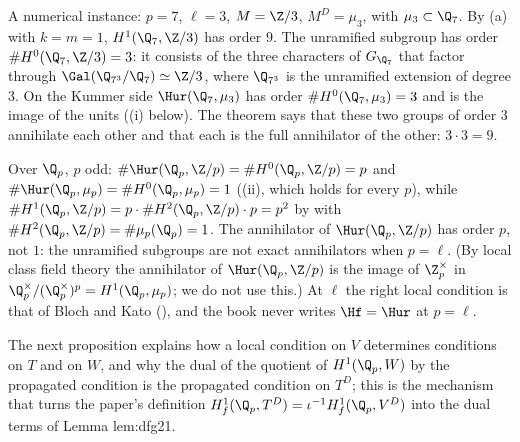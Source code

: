 \noindent A numerical instance: $p=7$, $\ell=3$, $M=\Z/3$, $M^D=\mu_3$, with $\mu_3\subset\Q_7$. By (a) with $k=m=1$, $H^1(\Q_7,\Z/3)$ has order $9$.
The unramified subgroup has order $\#H^0(\Q_7,\Z/3)=3$: it consists of the three characters of $G_{\Q_7}$ that factor through $\Gal(\Q_{7^3}/\Q_7)\simeq\Z/3$, where $\Q_{7^3}$ is
the unramified extension of degree $3$. On the Kummer side $\Hur(\Q_7,\mu_3)$ has order $\#H^0(\Q_7,\mu_3)=3$ and is the image of the units ((i)
below). The theorem says that these two groups of order $3$ annihilate each other and that each is the full annihilator of the other: $3\cdot3=9$.

\begin{warning}[the case $p=\ell$]\label{warn:galcoh:p-equals-l}
Over $\Q_p$, $p$ odd: $\#\Hur(\Q_p,\Z/p)=\#H^0(\Q_p,\Z/p)=p$ and $\#\Hur(\Q_p,\mu_p)=\#H^0(\Q_p,\mu_p)=1$ ((ii), which holds for every
$p$), while $\#H^1(\Q_p,\Z/p)=p\cdot\#H^2(\Q_p,\Z/p)\cdot p=p^2$ by  with $\#H^2(\Q_p,\Z/p)=\#\mu_p(\Q_p)=1$. The annihilator of $\Hur(\Q_p,\Z/p)$ has
order $p$, not $1$: the unramified subgroups are not exact annihilators when $p=\ell$. (By local class field theory the annihilator of $\Hur(\Q_p,\Z/p)$ is the image of
$\Z_p^\times$ in $\Q_p^\times/(\Q_p^\times)^p=H^1(\Q_p,\mu_p)$; we do not use this.) At $\ell$ the right local condition is that of Bloch and Kato (),
and the book never writes $\Hf=\Hur$ at $p=\ell$.
\end{warning}

The next proposition explains how a local condition on $V$ determines conditions on $T$ and on $W$, and why the dual of the quotient of $H^1(\Q_p,W)$ by the
propagated condition is the propagated condition on $T^D$; this is the mechanism that turns the paper's definition $H^1_f(\Q_p,T^D)=\iota^{-1}H^1_f(\Q_p,V^D)$ into the
dual terms of Lemma lem:dfg21.

